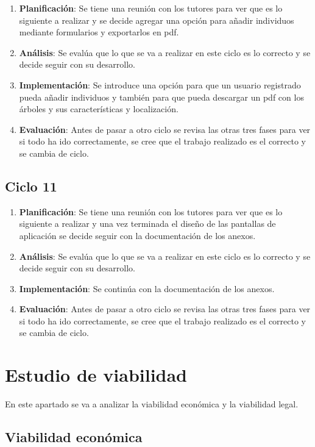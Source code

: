 \begin{enumerate}
	\item \textbf{Planificación}: Se tiene una reunión con los tutores para ver que es lo siguiente a realizar y se decide agregar una opción para añadir individuos mediante formularios y exportarlos en pdf.
	\item \textbf{Análisis}: Se evalúa que lo que se va a realizar en este ciclo es lo correcto y se decide seguir con su desarrollo.
	\item \textbf{Implementación}: Se introduce una opción para que un usuario registrado pueda añadir individuos y también para que pueda descargar un pdf con los árboles y sus características y localización.
	\item \textbf{Evaluación}: Antes de pasar a otro ciclo se revisa las otras tres fases para ver si todo ha ido correctamente, se cree que el trabajo realizado es el correcto y se cambia de ciclo.
\end{enumerate}

\subsection{Ciclo 11}

\begin{enumerate}
	\item \textbf{Planificación}: Se tiene una reunión con los tutores para ver que es lo siguiente a realizar y una vez terminada el diseño de las pantallas de aplicación se decide seguir con la documentación de los anexos.
	\item \textbf{Análisis}: Se evalúa que lo que se va a realizar en este ciclo es lo correcto y se decide seguir con su desarrollo.
	\item \textbf{Implementación}: Se continúa con la documentación de los anexos.
	\item \textbf{Evaluación}: Antes de pasar a otro ciclo se revisa las otras tres fases para ver si todo ha ido correctamente, se cree que el trabajo realizado es el correcto y se cambia de ciclo.
\end{enumerate}

\section{Estudio de viabilidad}

En este apartado se va a analizar la viabilidad económica y la viabilidad legal.


\subsection{Viabilidad económica}

